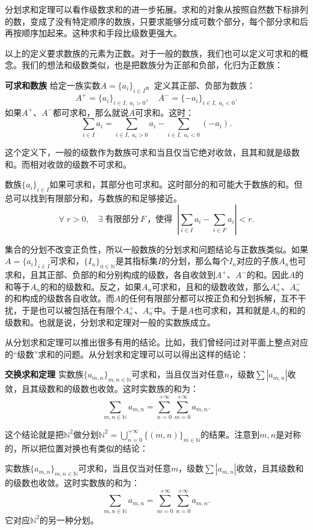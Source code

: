 \documentclass[12pt,UTF8,fontset=none]{ctexbook}
\begin{document}
分划求和定理可以看作级数求和的进一步拓展。求和的对象从按照自然数下标排列的数，变成了没有特定顺序的数族，只要求能够分成可数个部分，每个部分求和后再按顺序加起来。这种求和手段比级数更强大。

以上的定义要求数族的元素为正数。对于一般的数族，我们也可以定义可求和的概念。我们的想法和级数类似，也是把数族分为正部和负部，化归为正数族：
\begin{df}{\textbf{可求和数族}}
    给定一族实数$A = \{a_i\}_{i\in I}$。定义其正部、负部为数族：
    $$ A^+ = \{ a_i \}_{i\in I, \;a_i > 0} , \quad A^- = \{ -a_i \}_{i\in I, \;a_i < 0}. $$
    如果$A^+$、$A^-$都可求和，那么就说$A$可求和。这时：
    $$ \sum_{i\in I} a_i = \sum_{i\in I, \;a_i > 0} a_i - \sum_{i\in I, \;a_i < 0} (-a_i) . $$
\end{df}
这个定义下，一般的级数作为数族可求和当且仅当它绝对收敛，且其和就是级数和。而相对收敛的级数不可求和。

数族$\{a_i\}_{i\in I}$如果可求和，其部分也可求和。这时部分的和可能大于数族的和。但总可以找到有限部分和，与数族的和足够接近。
$$ \forall \; r>0, \quad \exists \;\mbox{有限部分}\,F\,\mbox{，使得}\;\; \left| \sum_{i\in I} a_i - \sum_{i\in F} a_i\right| < r.$$

集合的分划不改变正负性，所以一般数族的分划求和问题结论与正数族类似。如果$A = \{a_i\}_{i\in I}$可求和，$\{I_n\}_{n\in\mathbb{N}}$是其指标集$I$的分划，那么每个$I_n$对应的子族$A_n$也可求和，且其正部、负部的和分别构成的级数，各自收敛到$A^+$、$A^-$的和。因此$A$的和等于$A_n$的和的级数和。反之，如果$A_n$可求和，且和的级数收敛，那么$A_n^+$、$A_n^-$的和构成的级数各自收敛。而$A$的任何有限部分都可以按正负和分划拆解，互不干扰，于是也可以被包括在有限个$A_n^+$、$A_n^-$中。于是$A$也可求和，其和就是$A_n$的和的级数和。也就是说，分划求和定理对一般的实数族成立。

从分划求和定理可以推出很多有用的结论。比如，我们曾经问过对平面上整点对应的“级数”求和的问题。从分划求和定理可以可以得出这样的结论：
\begin{tm}{\textbf{交换求和定理}}
    实数族$\{a_{m,n}\}_{m,n\in\mathbb{N}}$可求和，当且仅当对任意$n$，级数$\sum |a_{m,n}|$收敛，且其级数和的级数也收敛。这时实数族的和为：
    $$ \sum_{m,n\in\mathbb{N}} a_{m,n} = \sum_{n=0}^{+\infty} \sum_{m=0}^{+\infty} a_{m,n}. $$
\end{tm}
这个结论就是把$\mathbb{N}^2$做分划$\mathbb{N}^2 = \bigcup_{n=0}^{+\infty} \{(m,n)\}_{m\in\mathbb{N}}$的结果。注意到$m,n$是对称的，所以把位置对换也有类似的结论：

实数族$\{a_{m,n}\}_{m,n\in\mathbb{N}}$可求和，当且仅当对任意$m$，级数$\sum |a_{m,n}|$收敛，且其级数和的级数也收敛。这时实数族的和为：
$$ \sum_{m,n\in\mathbb{N}} a_{m,n} = \sum_{m=0}^{+\infty} \sum_{n=0}^{+\infty} a_{m,n}. $$
它对应$\mathbb{N}^2$的另一种分划。
\end{document}
